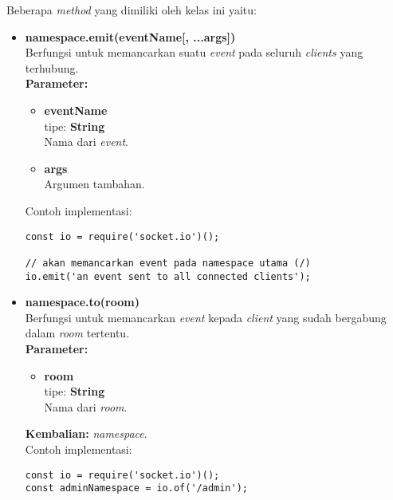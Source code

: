 \begin{enumerate}

	Beberapa \textit{method} yang dimiliki oleh kelas ini yaitu:
	\begin{itemize}
		\item \textbf{namespace.emit(eventName[, ...args])} \\
		Berfungsi untuk memancarkan suatu \textit{event} pada seluruh \textit{clients} yang terhubung. \\
		\textbf{Parameter:}
		\begin{itemize}
			\item \textbf{eventName} \\tipe: \textbf{String} \\ Nama dari \textit{event}.
			\item \textbf{args} \\ Argumen tambahan.
		\end{itemize}
		Contoh implementasi:
\begin{lstlisting}
const io = require('socket.io')();
		
// akan memancarkan event pada namespace utama (/)
io.emit('an event sent to all connected clients'); 
\end{lstlisting}
		
		\item \textbf{namespace.to(room)} \\ 
		Berfungsi untuk memancarkan \textit{event} kepada \textit{client} yang sudah bergabung dalam \textit{room} tertentu. \\ 
		\textbf{Parameter:}
		\begin{itemize}
			\item \textbf{room} \\tipe: \textbf{String} \\ Nama dari \textit{room}.
		\end{itemize}
		\textbf{Kembalian:} \textit{namespace}. \\
		Contoh implementasi:
\begin{lstlisting}
const io = require('socket.io')();
const adminNamespace = io.of('/admin');
	

\end{lstlisting}
\end{itemize}
\end{enumerate}
